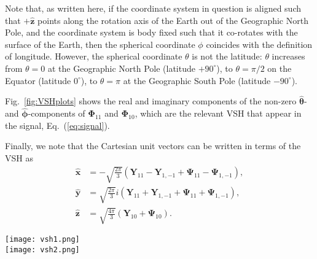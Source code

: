 \documentclass[amsmath,amssymb,aps,10pt,prd,letterpaper,nofootinbib,balancelastpage,notitlepage,superscriptaddress,twocolumn,floatfix]{revtex4-2}
\newcommand{\figref}[2][]{Fig{#1}.~\ref{#2}}		%
\newcommand{\secref}[2][]{Sec{#1}.~\ref{#2}}		%
\renewcommand{\eqref}[2][]{Eq{#1}.~(\ref{eq:#2})}	%
\newcommand{\citeR}[2][]{Ref{#1}.~\cite{#2}}		%
\newcommand{\xhat}{\bm{\hat{x}}}
\newcommand{\yhat}{\bm{\hat{y}}}
\newcommand{\zhat}{\bm{\hat{z}}}
\begin{document}
Note that, as written here, if the coordinate system in question is aligned such that $+\bm{\hat{z}}$ points along the rotation axis of the Earth out of the Geographic North Pole, and the coordinate system is body fixed such that it co-rotates with the surface of the Earth, then the spherical coordinate $\phi$ coincides with the definition of longitude.
However, the spherical coordinate $\theta$ is not the latitude: $\theta$ increases from $\theta = 0$ at the Geographic North Pole (latitude $+90^\circ$), to $\theta = \pi/2$ on the Equator (latitude $0^\circ$), to $\theta = \pi$ at the Geographic South Pole (latitude $-90^\circ$).

\figref{fig:VSHplots} shows the real and imaginary components of the non-zero $\bm{\hat{\theta}}$- and $\bm{\hat{\phi}}$-components of $\bm{\Phi}_{11}$ and $\bm{\Phi}_{10}$, which are the relevant VSH that appear in the signal, \eqref{signal}.

Finally, we note that the Cartesian unit vectors can be written in terms of the VSH as
\begin{align}
    \xhat&=-\sqrt{\frac{2\pi}3}(\bm{Y}_{11}-\bm{Y}_{1,-1}+\bm{\Psi}_{11}-\bm{\Psi}_{1,-1}),\label{eq:xharm}\\
    \yhat&=\sqrt{\frac{2\pi}3}i(\bm{Y}_{11}+\bm{Y}_{1,-1}+\bm{\Psi}_{11}+\bm{\Psi}_{1,-1}),\label{eq:yharm}\\
    \zhat&=\sqrt{\frac{4\pi}3}(\bm{Y}_{10}+\bm{\Psi}_{10}).\label{eq:zharm}
\end{align}

\begin{figure*}[t]
\texttt{[image: vsh1.png]}\\[1ex]
\texttt{[image: vsh2.png]}
\caption{\label{fig:VSHplots}%
    Shaded contour plots of the real and imaginary parts of all the non-zero $\bm{\hat{\theta}}$- and $\bm{\hat{\phi}}$-components of the vector spherical harmonics $\bm{\Phi}_{11}$ and $\bm{\Phi}_{10}$; the cognate plots for $\bm{\Phi}_{1,-1}$ can be read from those of $\bm{\Phi}_{11}$ using \eqref{Phiminus}.
    Red (blue) indicates positive (negative) values, with the color range for each plot independently normalized to span the range of values plotted.
    Overlaid are the outlines of the Earth's continents (white)~\cite{cartopy}. 
    The locations of the SuperMAG stations used in the analysis that is outlined in \secref{sec:experimentalSearch} (and which is the subject of \citeR{Fedderke:2021qva}) are shown as green points.
   }
\end{figure*}
\end{document}
